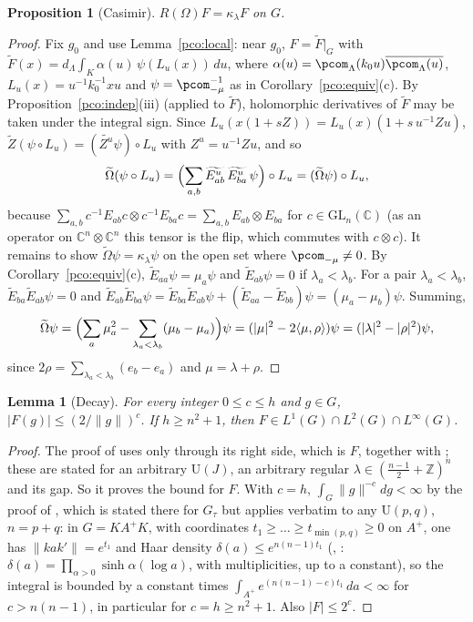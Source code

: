 \documentclass[10pt]{amsart}
\newtheorem{proposition}[theorem]{Proposition}
\newtheorem{lemma}[theorem]{Lemma}
\theoremstyle{definition}
\theoremstyle{remark}
\newcommand{\C}{\mathbb C}
\newcommand{\Z}{\mathbb Z}
\providecommand{\auU}{\mathrm U}
\begin{document}
\begin{proposition}[Casimir]\label{pco:casimir}
$R(\Omega)F=\kappa_\lambda F$ on $G$.
\end{proposition}
\begin{proof}
Fix $g_0$ and use Lemma~\ref{pco:local}: near $g_0$, $F=\widetilde F|_G$ with
$\widetilde F(x)=d_\Lambda\int_K\alpha(u)\,\psi(L_u(x))\,du$, where $\alpha(u)=\pcom_\Lambda(k_0u)
\overline{\pcom_\Lambda(u)}$, $L_u(x)=u^{-1}k_0^{-1}xu$ and $\psi=\pcom_{-\mu}^{-1}$ as in
Corollary~\ref{pco:equiv}(c). By Proposition~\ref{pco:indep}(iii) (applied to $\widetilde F$),
holomorphic derivatives of $\widetilde F$ may be taken under the integral sign. Since
$L_u(x(1+sZ))=L_u(x)(1+s\,u^{-1}Zu)$, $\widetilde Z(\psi\circ L_u)=(\widetilde{Z^u}\psi)\circ L_u$ with
$Z^u=u^{-1}Zu$, and so
\[
\widetilde\Omega(\psi\circ L_u)=\Bigl(\sum_{a,b}\widetilde{E_{ab}^u}\,\widetilde{E_{ba}^u}\,\psi\Bigr)\circ L_u
=(\widetilde\Omega\psi)\circ L_u,
\]
because $\sum_{a,b}c^{-1}E_{ab}c\otimes c^{-1}E_{ba}c=\sum_{a,b}E_{ab}\otimes E_{ba}$ for $c\in
\mathrm{GL}_n(\C)$ (as an operator on $\C^n\otimes\C^n$ this tensor is the flip, which commutes with
$c\otimes c$). It remains to show $\widetilde\Omega\psi=\kappa_\lambda\psi$ on the open set where
$\pcom_{-\mu}\ne0$. By Corollary~\ref{pco:equiv}(c), $\widetilde E_{aa}\psi=\mu_a\psi$ and
$\widetilde E_{ab}\psi=0$ if $\lambda_a<\lambda_b$. For a pair $\lambda_a<\lambda_b$,
$\widetilde E_{ba}\widetilde E_{ab}\psi=0$ and $\widetilde E_{ab}\widetilde E_{ba}\psi=\widetilde E_{ba}
\widetilde E_{ab}\psi+(\widetilde E_{aa}-\widetilde E_{bb})\psi=(\mu_a-\mu_b)\psi$. Summing,
\[
\widetilde\Omega\psi=\Bigl(\sum_a\mu_a^2-\sum_{\lambda_a<\lambda_b}(\mu_b-\mu_a)\Bigr)\psi
=(|\mu|^2-2\langle\mu,\rho\rangle)\psi=(|\lambda|^2-|\rho|^2)\psi,
\]
since $2\rho=\sum_{\lambda_a<\lambda_b}(e_b-e_a)$ and $\mu=\lambda+\rho$.
\end{proof}

\begin{lemma}[Decay]\label{pco:decay}
For every integer $0\le c\le h$ and $g\in G$, $|F(g)|\le(2/\|g\|)^c$. If $h\ge n^2+1$, then $F\in
L^1(G)\cap L^2(G)\cap L^\infty(G)$.
\end{lemma}
\begin{proof}
The proof of {\cite[Theorem~5.6]{P51}} uses {\cite[(59)]{P51}} only through its right side, which is
$F$, together with {\cite[Lemmas~5.4 and~5.5]{P51}}; these are stated for an
arbitrary $\auU(J)$, an arbitrary regular $\lambda\in(\frac{n-1}2+\Z)^n$ and its gap. So it proves
the bound for $F$. With $c=h$, $\int_G\|g\|^{-c}dg<\infty$ by the proof of
{\cite[Lemma~4.7(c)]{P51}}, which is stated there for $G_\tau$ but applies verbatim to any $\auU(p,q)$,
$n=p+q$: in $G=KA^+K$, with coordinates $t_1\ge\dots\ge t_{\min(p,q)}\ge0$ on $A^+$, one has
$\|kak'\|=e^{t_1}$ and Haar density $\delta(a)\le e^{n(n-1)t_1}$ (\cite[Ch.~I, \S5, no.~2]{Helgason}, \cite[Lemma~2.4.2]{WallachRRG1}: $\delta(a)=\prod_{\alpha>0}\sinh\alpha(\log a)$, with multiplicities, up to a constant), so the integral
is bounded by a constant times $\int_{A^+}e^{(n(n-1)-c)t_1}\,da<\infty$ for $c>n(n-1)$, in particular
for $c=h\ge n^2+1$. Also $|F|\le2^c$.
\end{proof}
\end{document}

